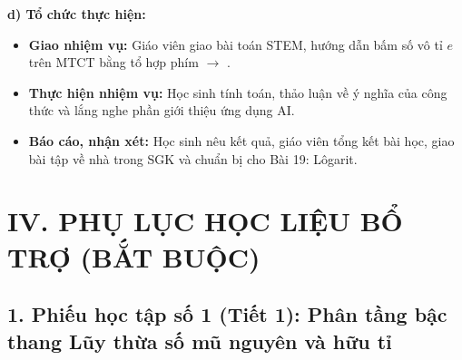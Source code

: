 \documentclass[12pt, a4paper]{article}
\begin{document}
\noindent \textbf{d) Tổ chức thực hiện:}
\begin{itemize}[leftmargin=0.6cm]
    \item \textbf{Giao nhiệm vụ:} Giáo viên giao bài toán STEM, hướng dẫn bấm số vô tỉ $e$ trên MTCT bằng tổ hợp phím  $\to$ .
    \item \textbf{Thực hiện nhiệm vụ:} Học sinh tính toán, thảo luận về ý nghĩa của công thức và lắng nghe phần giới thiệu ứng dụng AI.
    \item \textbf{Báo cáo, nhận xét:} Học sinh nêu kết quả, giáo viên tổng kết bài học, giao bài tập về nhà trong SGK và chuẩn bị cho Bài 19: Lôgarit.
\end{itemize}

\vspace{10pt}

\section*{IV. PHỤ LỤC HỌC LIỆU BỔ TRỢ (BẮT BUỘC)}

\subsection*{1. Phiếu học tập số 1 (Tiết 1): Phân tầng bậc thang Lũy thừa số mũ nguyên và hữu tỉ}
\end{document}

